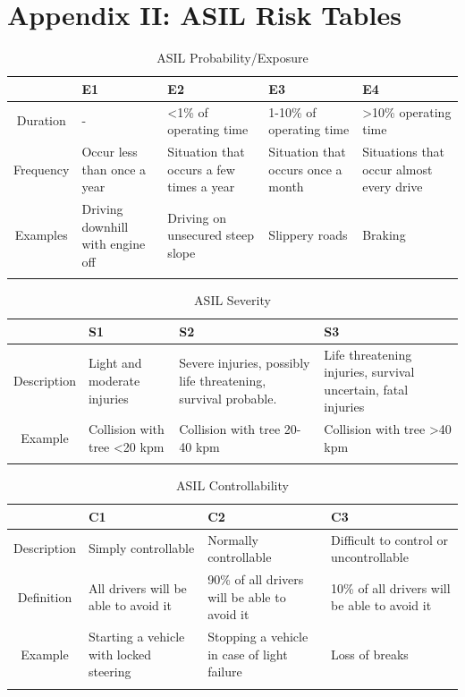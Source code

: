 \documentclass{article}
\begin{document}
\newpage
\section{Appendix II: ASIL Risk Tables}

\begin{table}[h]
    \begin{tabularx}{\linewidth}{ c | X | X | X | X}
 & E1 & E2 & E3 & E4 \\ \hline
Duration & - & \textless 1\% of operating time & 1-10\% of operating time & \textgreater 10\% operating time \\
Frequency & Occur less than once a year & Situation that occurs a few times a year & Situation that occurs once a month & Situations that occur almost every drive \\
Examples & Driving downhill with engine off & Driving on unsecured steep slope & Slippery roads & Braking \\
    \caption{ASIL Probability/Exposure \citep{international_organization_for_standardization_iso_2011}}
    \end{tabularx}
    \label{international_organization_for_standardization_iso_2011_probability}
\end{table}

\begin{table}[h]
    \begin{tabularx}{\linewidth}{ c | X | X | X}
 & S1 & S2 & S3 \\ \hline
Description & Light and moderate injuries & Severe injuries, possibly life threatening, survival probable. & Life threatening injuries, survival uncertain, fatal injuries \\
Example & Collision with tree \textless 20 kpm & Collision with tree 20-40 kpm & Collision with tree \textgreater 40 kpm \\
    \caption{ASIL Severity \citep{international_organization_for_standardization_iso_2011}}
    \end{tabularx}
    \label{international_organization_for_standardization_iso_2011_severity}
\end{table}

\begin{table}[h]
    \begin{tabularx}{\linewidth}{ c | X | X | X}
 & C1 & C2 & C3 \\ \hline
Description & Simply controllable & Normally controllable & Difficult to control or uncontrollable \\
Definition & All drivers will be able to avoid it & 90\% of all drivers will be able to avoid it & 10\% of all drivers will be able to avoid it \\
Example & Starting a vehicle with locked steering & Stopping a vehicle in case of light failure & Loss of breaks \\
    \caption{ASIL Controllability \citep{international_organization_for_standardization_iso_2011}}
    \end{tabularx}
    \label{international_organization_for_standardization_iso_2011_controllability}
\end{table}
\end{document}
